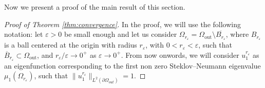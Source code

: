 \documentclass[12pt,reqno]{amsart}
\numberwithin{equation}{section}
\numberwithin{theorem}{section}
\numberwithin{equation}{section}
\numberwithin{theorem}{section}
\begin{document}
  Now we present a proof of the main result of this section.
\begin{proof}[Proof of Theorem \ref{thm:convergence}] In the proof, we will use the following notation: let $\varepsilon>0$ be small enough and let us consider $\Omega_{r_\varepsilon}= \Omega_\mathrm{out} \setminus \overline{B_{r_\varepsilon}}$, where $B_{r_\varepsilon}$ is a ball centered at the origin with radius $ r_\varepsilon$, with $0<r_\varepsilon<\varepsilon$, such that $\overline{B}_{r_\varepsilon}\subset \Omega_\mathrm{out}$, and  $r_\varepsilon/\varepsilon\to 0^+$ as $\varepsilon \to 0^+$. From now onwords, we will consider $u_1^{r_\varepsilon}$ as an eigenfunction corresponding to the first non zero Steklov--Neumann eigenvalue $\mu_1(\Omega_{r_\varepsilon})$, such that $\|u_1^{r_\varepsilon}\|_{L^2(\partial \Omega_{out})}=1$.


\end{proof}
\end{document}
